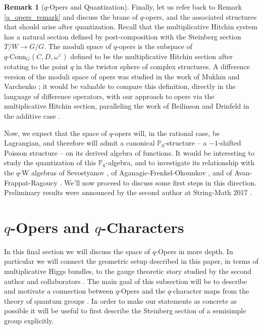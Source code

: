 \documentclass[11pt, oneside, reqno]{amsart}
\theoremstyle{definition} \newtheorem{definition}{Definition}[section]
\theoremstyle{definition} \newtheorem{remark}[definition]{Remark}
\theoremstyle{definition} \newtheorem{remarks}[definition]{Remarks}
\theoremstyle{definition} \newtheorem{question}[definition]{Question}
\theoremstyle{definition} \newtheorem*{note}{Note}
\theoremstyle{definition} \newtheorem{example}[definition]{Example}
\theoremstyle{definition} \newtheorem{examples}[definition]{Examples}
\newcommand{\bb}[1]{\mathbb{#1}}
\newcommand{\qconn}{q\text{-Conn}}
\begin{document}
\begin{remark}[$q$-Opers and Quantization]
Finally, let us refer back to Remark \ref{q_opers_remark} and discuss the brane of $q$-opers, and the associated structures that should arise after quantization.  Recall that the multiplicative Hitchin system has a natural section defined by post-composition with the Steinberg section $T/W \to G/G$.  The moduli space of $q$-opers is the subspace of $\qconn_G(C,D,\omega^\vee)$ defined to be the multiplicative Hitchin section after rotating to the point $q$ in the twistor sphere of complex structures.  A difference version of the moduli space of opers was studied in the work of Mukhin and Varchenko \cite{MukhinVarchenko}; it would be valuable to compare this definition, directly in the language of difference operators, with our approach to opers via the multiplicative Hitchin section, paralleling the work of Beilinson and Drinfeld in the additive case \cite[Section 3.1]{BDHitchin}.

Now, we expect that the space of $q$-opers will, in the rational case, be Lagrangian, and therefore will admit a canonical $\bb P_0$-structure -- a $-1$-shifted Poisson structure -- on its derived algebra of functions.  It would be interesting to study the quantization of this $\bb P_0$-algebra, and to investigate its relationship with the $q$-W algebras of Sevostyanov \cite{Knight,STSSevostyanov, Sevostyanov}, of Aganagic-Frenkel-Okounkov \cite{AFO}, and of Avan-Frappat-Ragoucy \cite{AvanFrappatRagoucy}.  We'll now proceed to discuss some first steps in this direction.  Preliminary results were announced by the second author at String-Math 2017 \cite{PestunStringMath}.  
\end{remark}

\section{$q$-Opers and $q$-Characters} \label{qchar_section}

In this final section we will discuss the space of $q$-Opers in more depth.  In particular we will connect the geometric setup described in this paper, in terms of multiplicative Higgs bundles, to the gauge theoretic story studied by the second author and collaborators \cite{NekrasovPestunShatashvili,Kimura:2015rgi,Nekrasov:2015wsu}.  The main goal of this subsection will be to describe and motivate a connection between $q$-Opers and the $q$-character maps from the theory of quantum groups \cite{FrenkelReshetikhinSTS,FrenkelReshetikhin2,FrenkelReshetikhin1,Sevostyanov,STSSevostyanov,Sevostyanov1}.  In order to make our statements as concrete as possible it will be useful to first describe the Steinberg section \cite{Steinberg} of a semisimple group explicitly.
\end{document}
